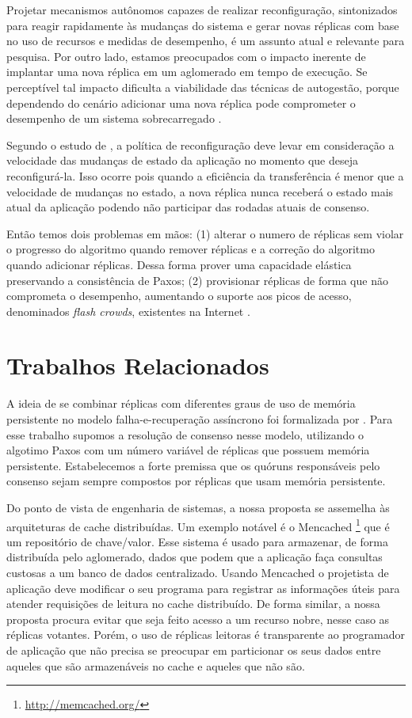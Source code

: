 Projetar mecanismos autônomos capazes de realizar reconfiguração, sintonizados para reagir
rapidamente às mudanças do sistema e gerar novas réplicas com base no uso de recursos e
medidas de desempenho, é um assunto atual e relevante para pesquisa. Por outro lado,
estamos preocupados com o impacto inerente de implantar uma nova réplica em um aglomerado
em tempo de execução. Se perceptível tal impacto dificulta a viabilidade das técnicas de
autogestão, porque dependendo do cenário adicionar uma nova réplica pode comprometer o
desempenho de um sistema sobrecarregado \cite{vilaca09}.

Segundo o estudo de , a política de reconfiguração deve levar em
consideração a velocidade das mudanças de estado da aplicação no momento que deseja
reconfigurá-la. Isso  ocorre  pois quando a eficiência da transferência é menor que a
velocidade de mudanças no estado, a nova réplica  nunca receberá o estado mais atual da
aplicação podendo não participar das rodadas atuais de consenso.

Então temos dois problemas em mãos: (1) alterar o numero de réplicas sem violar o
progresso do algoritmo quando remover réplicas e a correção do algoritmo quando adicionar
réplicas. Dessa forma prover uma capacidade elástica preservando a consistência de Paxos;
(2) provisionar réplicas de forma que não comprometa o desempenho, aumentando o suporte
aos picos de acesso, denominados \emph{flash crowds}, existentes na Internet
\cite{tanenbaum07}.


\section{Trabalhos Relacionados}\label{sec:trabalhos-relacionados}

A ideia de se combinar réplicas com diferentes graus de uso de memória persistente no
modelo falha-e-recuperação assíncrono foi formalizada por . Para
esse trabalho supomos a resolução de consenso nesse modelo, utilizando o algotimo Paxos
com um número variável de réplicas que possuem memória persistente. Estabelecemos a forte
premissa que os quóruns responsáveis pelo consenso sejam sempre compostos por réplicas que
usam memória persistente.

Do ponto de vista de engenharia de sistemas, a nossa proposta se assemelha às arquiteturas
de cache distribuídas. Um exemplo notável é o Mencached
\footnote{\url{http://memcached.org/}} que é um repositório de chave/valor. Esse sistema é
usado para armazenar, de forma distribuída pelo aglomerado, dados que podem que a
aplicação faça consultas custosas a um banco de dados centralizado. Usando Mencached o
projetista de aplicação deve modificar o seu programa para registrar as informações úteis
para atender requisições de leitura no cache distribuído. De forma similar, a nossa
proposta procura evitar que seja feito acesso a um recurso nobre, nesse caso as réplicas
votantes. Porém, o uso de réplicas leitoras é transparente ao programador de aplicação que
não precisa se preocupar em particionar os seus dados entre aqueles que são armazenáveis
no cache e aqueles que não são.

